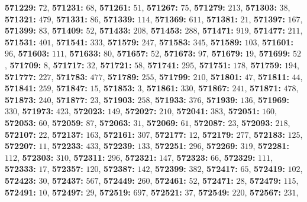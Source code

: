 \textsf{\bfseries 571229:} $72$, \textsf{\bfseries 571231:} $68$, \textsf{\bfseries 571261:} $51$, \textsf{\bfseries 571267:} $75$, \textsf{\bfseries 571279:} $213$, \textsf{\bfseries 571303:} $38$, \textsf{\bfseries 571321:} $479$, \textsf{\bfseries 571331:} $86$, \textsf{\bfseries 571339:} $114$, \textsf{\bfseries 571369:} $611$, \textsf{\bfseries 571381:} $21$, \textsf{\bfseries 571397:} $167$, \textsf{\bfseries 571399:} $83$, \textsf{\bfseries 571409:} $52$, \textsf{\bfseries 571433:} $208$, \textsf{\bfseries 571453:} $288$, \textsf{\bfseries 571471:} $919$, \textsf{\bfseries 571477:} $211$, \textsf{\bfseries 571531:} $401$, \textsf{\bfseries 571541:} $333$, \textsf{\bfseries 571579:} $247$, \textsf{\bfseries 571583:} $345$, \textsf{\bfseries 571589:} $103$, \textsf{\bfseries 571601:} $96$, \textsf{\bfseries 571603:} $111$, \textsf{\bfseries 571633:} $80$, \textsf{\bfseries 571657:} $52$, \textsf{\bfseries 571673:} $97$, \textsf{\bfseries 571679:} $19$, \textsf{\bfseries 571699:} $52$, \textsf{\bfseries 571709:} $8$, \textsf{\bfseries 571717:} $32$, \textsf{\bfseries 571721:} $58$, \textsf{\bfseries 571741:} $295$, \textsf{\bfseries 571751:} $178$, \textsf{\bfseries 571759:} $194$, \textsf{\bfseries 571777:} $227$, \textsf{\bfseries 571783:} $477$, \textsf{\bfseries 571789:} $255$, \textsf{\bfseries 571799:} $210$, \textsf{\bfseries 571801:} $47$, \textsf{\bfseries 571811:} $44$, \textsf{\bfseries 571841:} $259$, \textsf{\bfseries 571847:} $15$, \textsf{\bfseries 571853:} $3$, \textsf{\bfseries 571861:} $330$, \textsf{\bfseries 571867:} $241$, \textsf{\bfseries 571871:} $478$, \textsf{\bfseries 571873:} $240$, \textsf{\bfseries 571877:} $23$, \textsf{\bfseries 571903:} $258$, \textsf{\bfseries 571933:} $376$, \textsf{\bfseries 571939:} $136$, \textsf{\bfseries 571969:} $330$, \textsf{\bfseries 571973:} $423$, \textsf{\bfseries 572023:} $149$, \textsf{\bfseries 572027:} $210$, \textsf{\bfseries 572041:} $383$, \textsf{\bfseries 572051:} $160$, \textsf{\bfseries 572053:} $60$, \textsf{\bfseries 572059:} $87$, \textsf{\bfseries 572063:} $31$, \textsf{\bfseries 572069:} $61$, \textsf{\bfseries 572087:} $23$, \textsf{\bfseries 572093:} $218$, \textsf{\bfseries 572107:} $22$, \textsf{\bfseries 572137:} $163$, \textsf{\bfseries 572161:} $307$, \textsf{\bfseries 572177:} $12$, \textsf{\bfseries 572179:} $277$, \textsf{\bfseries 572183:} $125$, \textsf{\bfseries 572207:} $11$, \textsf{\bfseries 572233:} $433$, \textsf{\bfseries 572239:} $133$, \textsf{\bfseries 572251:} $296$, \textsf{\bfseries 572269:} $319$, \textsf{\bfseries 572281:} $112$, \textsf{\bfseries 572303:} $310$, \textsf{\bfseries 572311:} $296$, \textsf{\bfseries 572321:} $147$, \textsf{\bfseries 572323:} $66$, \textsf{\bfseries 572329:} $111$, \textsf{\bfseries 572333:} $17$, \textsf{\bfseries 572357:} $120$, \textsf{\bfseries 572387:} $142$, \textsf{\bfseries 572399:} $382$, \textsf{\bfseries 572417:} $65$, \textsf{\bfseries 572419:} $102$, \textsf{\bfseries 572423:} $30$, \textsf{\bfseries 572437:} $567$, \textsf{\bfseries 572449:} $260$, \textsf{\bfseries 572461:} $52$, \textsf{\bfseries 572471:} $28$, \textsf{\bfseries 572479:} $115$, \textsf{\bfseries 572491:} $10$, \textsf{\bfseries 572497:} $29$, \textsf{\bfseries 572519:} $697$, \textsf{\bfseries 572521:} $37$, \textsf{\bfseries 572549:} $220$, \textsf{\bfseries 572567:} $231$, 
